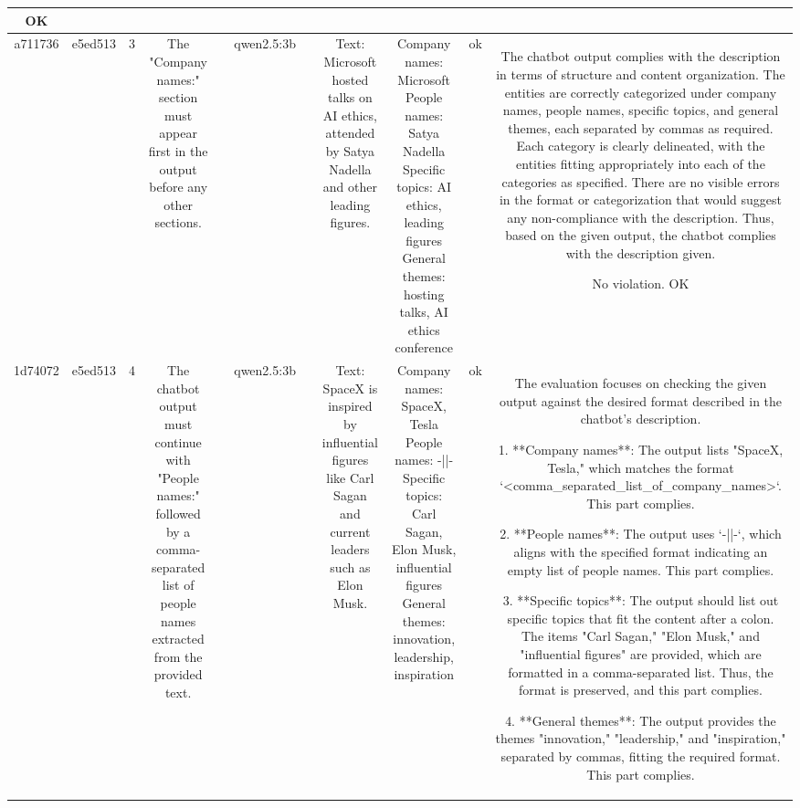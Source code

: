 \begin{table}[h!]
\begin{tabular}{|c|c|c|c|c|c|c|c|c|c|c|}
OK\\
\hline
a711736 & e5ed513 & 3 & The "Company names:" section must appear first in the output before any other sections. &  & qwen2.5:3b &  & Text: Microsoft hosted talks on AI ethics, attended by Satya Nadella and other leading figures. & Company names: Microsoft
People names: Satya Nadella
Specific topics: AI ethics, leading figures
General themes: hosting talks, AI ethics conference & ok & The chatbot output complies with the description in terms of structure and content organization. The entities are correctly categorized under company names, people names, specific topics, and general themes, each separated by commas as required. Each category is clearly delineated, with the entities fitting appropriately into each of the categories as specified. There are no visible errors in the format or categorization that would suggest any non-compliance with the description. Thus, based on the given output, the chatbot complies with the description given.

No violation.
OK\\
\hline
1d74072 & e5ed513 & 4 & The chatbot output must continue with "People names:" followed by a comma-separated list of people names extracted from the provided text. &  & qwen2.5:3b &  & Text: SpaceX is inspired by influential figures like Carl Sagan and current leaders such as Elon Musk. & Company names: SpaceX, Tesla
People names: -||-
Specific topics: Carl Sagan, Elon Musk, influential figures
General themes: innovation, leadership, inspiration & ok & The evaluation focuses on checking the given output against the desired format described in the chatbot's description. 

1. **Company names**: The output lists "SpaceX, Tesla," which matches the format `<comma_separated_list_of_company_names>`. This part complies.

2. **People names**: The output uses `-||-`, which aligns with the specified format indicating an empty list of people names. This part complies.

3. **Specific topics**: The output should list out specific topics that fit the content after a colon. The items "Carl Sagan," "Elon Musk," and "influential figures" are provided, which are formatted in a comma-separated list. Thus, the format is preserved, and this part complies.

4. **General themes**: The output provides the themes "innovation," "leadership," and "inspiration," separated by commas, fitting the required format. This part complies.


\end{tabular}
\end{table}
